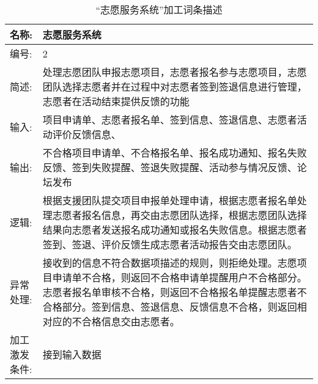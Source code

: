 \begin{table}[H]  
\caption{“志愿服务系统”加工词条描述}  
\begin{center}  
    \begin{tabular}{l p{11cm}} 
        \hline
        \quad 名称:  &   志愿服务系统 \\
        \hline
        \quad 编号:  & 2 \\
        \hline
        \quad 简述:  & 处理志愿团队申报志愿项目，志愿者报名参与志愿项目，志愿团队选择志愿者并在过程中对志愿者签到签退信息进行管理，志愿者在活动结束提供反馈的功能 \\
        \hline
        \quad 输入:  & 项目申请单、志愿者报名单、签到信息、签退信息、志愿者活动评价反馈信息、 \\
        \hline
        \quad 输出:  & 不合格项目申请单、不合格报名单、报名成功通知、报名失败反馈、签到失败提醒、签退失败提醒、活动参与情况反馈、论坛发布 \\
        \hline
        \quad 逻辑:  & 根据支援团队提交项目申报单处理申请，根据志愿者报名单处理志愿者报名信息，再交由志愿团队选择，根据志愿团队选择结果向志愿者发送报名成功通知或报名失败信息。根据志愿者签到、签退、评价反馈生成志愿者活动报告交由志愿团队。 \\
        \hline
        \quad 异常处理: & 接收到的信息不符合数据项描述的规则，则拒绝处理。志愿项目申请单不合格，则返回不合格申请单提醒用户不合格部分。志愿者报名单审核不合格，则返回不合格报名单提醒志愿者不合格部分。签到信息、签退信息、反馈信息不合格，则返回相对应的不合格信息交由志愿者。\\ 
        \hline
        \quad 加工激发条件: & 接到输入数据 \\ 
        \hline
    \end{tabular}
    \label{tab1}
\end{center}
\end{table}


